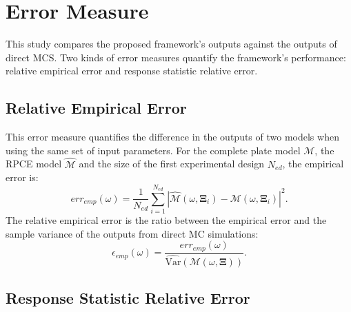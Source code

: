 %
%

\section{Error Measure}
\label{sec: performance measure}

This study compares the proposed framework's outputs against the outputs of direct MCS.
Two kinds of error measures quantify the framework's performance: relative empirical error and response statistic relative error.

\subsection{Relative Empirical Error}
\label{ssec: pointwise error}

This error measure quantifies the difference in the outputs of two models when using the same set of input parameters.
For the complete plate model $\mathcal{M}$, the RPCE model $\widehat{\mathcal{M}}$ and the size of the first experimental design $N_{ed}$, the empirical error is:
\begin{equation}
    err_{emp} \left(\omega\right)
    =
    \frac{1}{N_{ed}} \sum_{i=1}^{N_{ed}}{
        \left|
            \widehat{\mathcal{M}} \left(
                \omega, \mathbf{\Xi}_{i}
            \right)
            -
            \mathcal{M} \left(
                \omega, \mathbf{\Xi}_{i}
            \right)
        \right|^{2}
    }.
\end{equation}
The relative empirical error is the ratio between the empirical error and the sample variance of the outputs from direct MC simulations:
\begin{equation}
    \epsilon_{emp} \left(\omega\right)
    =
    \frac{
        err_{emp} \left(\omega\right)
    }{
        \widehat{\text{Var}}\left(
            \mathcal{M}\left(
                \omega, \mathbf{\Xi}
            \right)
        \right)
    }.
\end{equation}

\subsection{Response Statistic Relative Error}
\label{ssec: statistic error}

